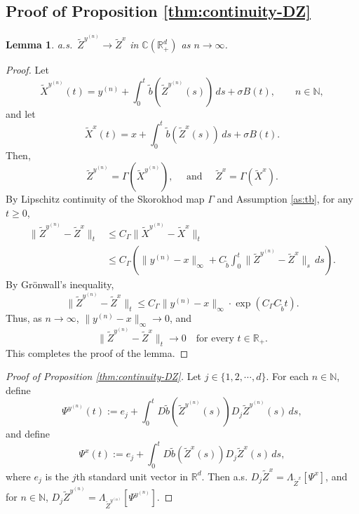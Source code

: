 \documentclass[11pt]{article}
\theoremstyle{definition}
\theoremstyle{plain}
\newtheorem{lemma}[assumption]{Lemma}
\newcommand{\R}{\mathbb{R}}
\newcommand{\C}{\mathbb{C}}
\newcommand{\tb}{\tilde{b}}
\begin{document}
\begin{appendices}
\subsection{Proof of Proposition \ref{thm:continuity-DZ}}

\begin{lemma}\label{lem:Z-conv}
  a.s.\ \( \tilde{Z}^{y^{(n)}} \to \tilde{Z}^x \) in \( \C(\mathbb{R}_+^d) \) as \( n \to \infty \).
  \end{lemma}
  
  \begin{proof}
  Let
  \[
  \tilde{X}^{y^{(n)}}(t) = y^{(n)} + \int_0^t \tb(\tilde{Z}^{y^{(n)}}(s))\,ds + \sigma B(t), \qquad n \in \mathbb{N},
  \]
  and let
  \[
  \tilde{X}^x(t) = x + \int_0^t \tb(\tilde{Z}^x(s))\,ds + \sigma B(t).
  \]
  Then,
  \[
  \tilde{Z}^{y^{(n)}} = \Gamma(\tilde{X}^{y^{(n)}}), \quad \text{ and } \quad \tilde{Z}^x = \Gamma(\tilde{X}^x).
  \]
  By Lipschitz continuity of the Skorokhod map \( \Gamma \) and Assumption \ref{as:tb}, for any \( t \ge 0 \),
  \begin{align*}
  \| \tilde{Z}^{y^{(n)}} - \tilde{Z}^x \|_t
  &\le C_\Gamma \| \tilde{X}^{y^{(n)}} - \tilde{X}^x \|_t \\
  &\le C_\Gamma \left( \| y^{(n)} - x \|_\infty + C_{\tb} \int_0^t \| \tilde{Z}^{y^{(n)}} - \tilde{Z}^x \|_s\,ds \right).
  \end{align*}
  By Grönwall’s inequality, \[
  \| \tilde{Z}^{y^{(n)}} - \tilde{Z}^x \|_t \le C_\Gamma \| y^{(n)} - x \|_\infty \cdot \exp(C_\Gamma C_{\tb} t).
  \]
  Thus, as \( n \to \infty \), \( \| y^{(n)} - x \|_\infty \to 0 \), and
  \[
  \| \tilde{Z}^{y^{(n)}} - \tilde{Z}^x \|_t \to 0 \quad \text{for every } t \in \mathbb{R}_+.
  \]
  This completes the proof of the lemma. \end{proof}
  
  \begin{proof}[Proof of Proposition \ref{thm:continuity-DZ}] 
  Let $j \in \{1, 2, \cdots, d\}$. 
  For each \( n \in \mathbb{N} \), define
  \begin{equation}\label{eq:Psi-yn}
  \Psi^{y^{(n)}}(t) := e_j + \int_0^t D\tb(\tilde{Z}^{y^{(n)}}(s)) D_j\tilde{Z}^{y^{(n)}}(s)\,ds,
  \end{equation}
  and define
  \begin{equation}\label{eq:Psi-x}
  \Psi^x(t) := e_j + \int_0^t D\tb(\tilde{Z}^x(s)) D_j\tilde{Z}^x(s)\,ds, 
  \end{equation}
  where $e_j$ is the $j$th standard unit vector in $\R^d$.
  Then a.s. \( D_j\tilde{Z}^x = \Lambda_{\tilde{Z}^x}[\Psi^x] \), and for \( n \in \mathbb{N} \),
  $D_j\tilde{Z}^{y^{(n)}} = \Lambda_{\tilde{Z}^{y^{(n)}}}[\Psi^{y^{(n)}}]$.
  

\end{proof}
\end{appendices}
\end{document}
